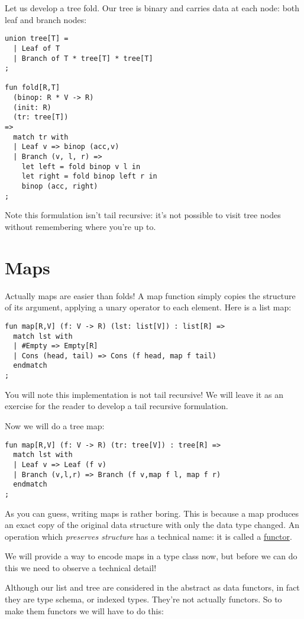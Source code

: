 \documentclass[oneside]{book}
\begin{document}
Let us develop a tree fold. Our tree is binary and carries
data at each node: both leaf and branch nodes:

\begin{verbatim}
union tree[T] =
  | Leaf of T
  | Branch of T * tree[T] * tree[T]
;

fun fold[R,T]
  (binop: R * V -> R)
  (init: R)
  (tr: tree[T])
=>
  match tr with
  | Leaf v => binop (acc,v)
  | Branch (v, l, r) =>
    let left = fold binop v l in
    let right = fold binop left r in
    binop (acc, right)
;
\end{verbatim}

Note this formulation isn't tail recursive: it's not possible
to visit tree nodes without remembering where you're up to.

\section{Maps}
Actually maps are easier than folds! A map function simply
copies the structure of its argument, applying a unary operator
to each element. Here is a list map:

\begin{verbatim}
fun map[R,V] (f: V -> R) (lst: list[V]) : list[R] =>
  match lst with
  | #Empty => Empty[R]
  | Cons (head, tail) => Cons (f head, map f tail)
  endmatch
;
\end{verbatim}

You will note this implementation is not tail recursive!
We will leave it as an exercise for the reader to 
develop a tail recursive formulation.

Now we will do a tree map:

\begin{verbatim}
fun map[R,V] (f: V -> R) (tr: tree[V]) : tree[R] =>
  match lst with
  | Leaf v => Leaf (f v)
  | Branch (v,l,r) => Branch (f v,map f l, map f r)
  endmatch
;
\end{verbatim}

As you can guess, writing maps is rather boring.
This is because a map produces an exact copy of the
original data structure with only the data type changed.
An operation which {\em preserves structure} has a technical
name: it is called a \href{https://en.wikipedia.org/wiki/Functor}{functor}.

We will provide a way to encode maps in a type class now,
but before we can do this we need to observe a technical detail!

Although our list and tree are considered in the abstract as
data functors, in fact they are type schema, or indexed types.
They're not actually functors. So to make them functors we
will have to do this:
\end{document}
